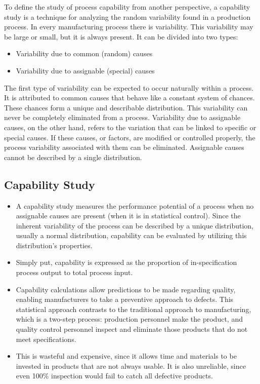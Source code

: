 \documentclass[]{report}
\begin{document}
To define the study of process capability from another perspective, a capability study is a technique for analyzing the random variability found in a production process. In every manufacturing process there is variability. This variability may be large or small, but it is always present. It can be divided into two types:

\begin{itemize}
\item Variability due to common (random) causes
\item Variability due to assignable (special) causes
\end{itemize}
The first type of variability can be expected to occur naturally within a process. It is attributed to common causes that behave like a constant system of chances. These chances form a unique and describable distribution. This variability can never be completely eliminated from a process. Variability due to assignable causes, on the other hand, refers to the variation that can be linked to specific or special causes. If these causes, or factors, are modified or controlled properly, the process variability associated with them can be eliminated. Assignable causes cannot be described by a single distribution.
\newpage
\subsection{Capability Study} 
\large
\begin{itemize}
\item A capability study measures the performance potential of a process when no assignable causes are present (when it is in statistical control). Since the inherent variability of the process can be described by a unique distribution, usually a normal distribution, capability can be evaluated by utilizing this distribution’s properties. 
\item Simply put, capability is expressed as the proportion of in-specification process output to total process input.

\item Capability calculations allow predictions to be made regarding quality, enabling manufacturers to take a preventive approach to defects. This statistical approach contrasts to the traditional approach to manufacturing, which is a two-step process: production personnel make the product, and quality control personnel inspect and eliminate those products that do not meet specifications. \item This is wasteful and expensive, since it allows time and materials to be invested in products that are not always usable. It is also unreliable, since even 100\% inspection would fail to catch all defective products.
\end{itemize}
\end{document}
